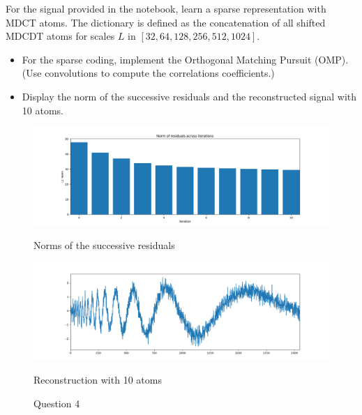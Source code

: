 \documentclass[11pt]{article}
\begin{document}
\begin{exercise}[subtitle=Sparse coding with OMP]
For the signal provided in the notebook, learn a sparse representation with MDCT atoms.
The dictionary is defined as the concatenation of all shifted MDCDT atoms for scales $L$ in $[32, 64, 128, 256, 512, 1024]$.

\begin{itemize}
    \item For the sparse coding, implement the Orthogonal Matching Pursuit (OMP). (Use convolutions to compute the correlations coefficients.)
    \item Display the norm of the successive residuals and the reconstructed signal with 10 atoms.
\end{itemize}

\end{exercise}
\begin{solution}


\begin{figure}
    \centering
    \begin{minipage}[t]{0.45\textwidth}
    \centerline{\includegraphics[width=\textwidth]{imgs/norm.png}}
    \centerline{Norms of the successive residuals}
    \end{minipage}
    \hfill
    \begin{minipage}[t]{0.45\textwidth}    \centerline{\includegraphics[width=\textwidth]{imgs/reconstruction.png}}
    \centerline{Reconstruction with 10 atoms}
    \end{minipage}
    \caption{Question 4}
\end{figure}



\end{solution}
\end{document}
